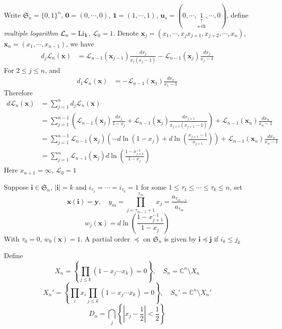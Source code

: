 \documentclass[main]{subfiles}
\begin{document}
\begin{lemma}\label{Total differential on L_n}
Write $\mathfrak S_n=\{0,1\}^n$, $\mathbf0=(0,\cdots,0)$, $\mathbf1=(1,\cdots,1)$, $\mathbf u_s=(0,\cdots,\underset{s\text{-th}}{\underset{\uparrow}{1}},\cdots,0)$, define \textit{multiple logarithm} $\mathcal L_n=\operatorname{Li}_{\mathbf1}$, $\mathcal L_0=1$. Denote $\mathbf x_j=(x_1,\cdots,x_jx_{j+1},x_{j+2},\cdots,x_n)$, $\mathbf x_n=(x_1,\cdots,x_{n-1})$, we have
\begin{align*}
d_j\mathcal L_n(\mathbf x)&=\mathcal L_{n-1}(\mathbf x_{j-1})\frac{dx_j}{x_j(x_j-1)}-\mathcal L_{n-1}(\mathbf x_j)\frac{dx_j}{x_j-1}
\end{align*}For $2\leq j\leq n$, and
\begin{align*}
d_1\mathcal L_n(\mathbf x)&=-\mathcal L_{n-1}(\mathbf x_1)\frac{dx_1}{x_1-1}
\end{align*}
Therefore
\begin{align*}
d\mathcal L_n(\mathbf x)&=\sum_{j=1}^nd_j\mathcal L_n(\mathbf x) \\
&=\sum_{j=1}^{n-1}\left(\mathcal L_{n-1}(\mathbf x_j)\frac{dx_j}{1-x_j}+\mathcal L_{n-1}(\mathbf x_{j})\frac{dx_{j+1}}{x_{j+1}(x_{j+1}-1)}\right)+\mathcal L_{n-1}(\mathbf x_n)\frac{dx_n}{x_n-1} \\
&=\sum_{j=1}^{n-1}\mathcal L_{n-1}(\mathbf x_j)\left(-d\ln(1-x_j)+d\ln\left(\frac{x_{j+1}-1}{x_{j+1}}\right)\right)+\mathcal L_{n-1}(\mathbf x_n)\frac{dx_n}{x_n-1} \\
&=\sum_{j=1}^{n}\mathcal L_{n-1}(\mathbf x_j)d\ln\left(\frac{1-x_{j+1}^{-1}}{1-x_j}\right)
\end{align*}
Here $x_{n+1}=\infty$, $\mathcal L_0=1$
\end{lemma}

Suppose $\mathbf i\in\mathfrak S_n$, $|\mathbf i|=k$ and $i_{\tau_1}=\cdots=i_{\tau_k}=1$ for some $1\leq\tau_1\leq\cdots\leq\tau_k\leq n$, set
\[\mathbf x(\mathbf i)=\mathbf y,\quad y_m=\prod_{j=\tau_{m-1}+1}^{\tau_m}x_j=\frac{a_{\tau_{m-1}}}{a_{\tau_{m}}}\]
\[w_j(\mathbf x)=d\ln\left(\frac{1-x_{j+1}^{-1}}{1-x_j}\right)\]
With $\tau_0=0$, $w_0(\mathbf x)=1$. A partial order $\preceq$ on $\mathfrak S_n$ is given by $\mathbf i\preceq \mathbf j$ if $i_k\leq j_k$ \par
Define
\[X_n=\left\{\prod_{j\leq k}(1-x_j\cdots x_k)=0\right\},\quad S_n=\mathbb C^n\setminus X_n\]
\[X_n'=\left\{\prod_{i}x_i\prod_{j\leq k}(1-x_j\cdots x_k)=0\right\},\quad S_n'=\mathbb C^n\setminus X_n'\]
\[D_n=\bigcap_{j}\left\{\left|x_j-\frac{1}{2}\right|<\frac{1}{2}\right\}\]
\end{document}
